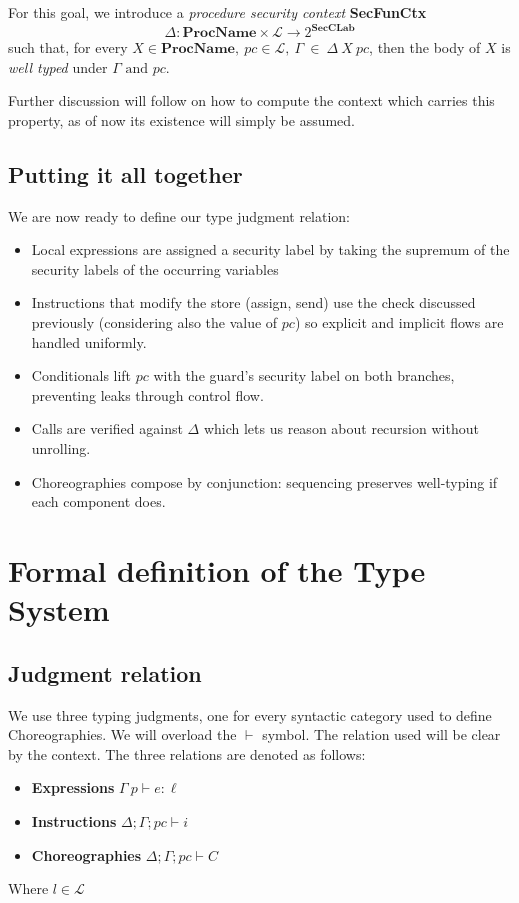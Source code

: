 \documentclass[12pt,a4paper,twoside]{book}
\newcommand{\MCL}{\mathscr{L}}
\begin{document}
For this goal, we introduce a \textit{procedure security context} \textbf{SecFunCtx}
$$\Delta: \textbf{ProcName} \times \MCL \rightarrow 2^\textbf{SecCLab}$$
such that, for every $X \in \textbf{ProcName}, ~ pc \in \MCL, ~ \Gamma ~ \in ~ \Delta ~ X ~ pc$, then the body of $X$ is \textit{well typed} under $\Gamma \text{ and } pc$.

Further discussion will follow on how to compute the context which carries this property, as of now its existence will simply be assumed.

\subsection{Putting it all together}
We are now ready to define our type judgment relation:
\begin{itemize}
  \item Local expressions are assigned a security label by taking the supremum of the security labels of the occurring variables
  \item Instructions that modify the store (assign, send) use the check discussed previously (considering also the value of $pc$) so explicit and implicit flows are handled uniformly.
  \item Conditionals lift $pc$ with the guard's security label on both branches, preventing leaks through control flow.
  \item Calls are verified against $\Delta$ which lets us reason about recursion without unrolling.
  \item Choreographies compose by conjunction: sequencing preserves well-typing if each component does.
\end{itemize}

\section{Formal definition of the Type System}
\label{type:formal}

\subsection{Judgment relation}
We use three typing judgments, one for every syntactic category used to define Choreographies. We will overload the $\vdash$ symbol. The relation used will be clear by the context. The three relations are denoted as follows:
\begin{itemize}
	\item{\textbf{Expressions}} \(\Gamma~p \vdash e : \ell\)
	\item{\textbf{Instructions}} \(\Delta;\Gamma;pc \vdash i\)
	\item{\textbf{Choreographies}} \(\Delta;\Gamma;pc \vdash C\)
\end{itemize}
Where $l \in \MCL$ 
\end{document}
